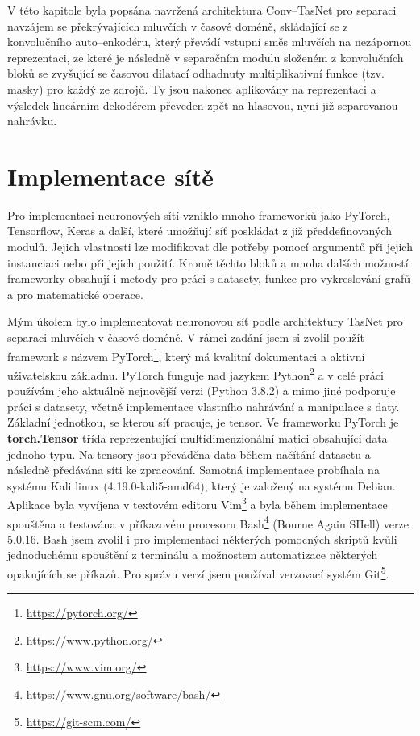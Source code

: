 V této kapitole byla popsána navržená architektura Conv--TasNet pro separaci navzájem se překrývajících mluvčích v časové doméně, skládající se z konvolučního auto--enkodéru, který převádí vstupní směs mluvčích na nezápornou reprezentaci, ze které je následně v separačním modulu složeném z konvolučních bloků se zvyšující se časovou dilatací odhadnuty multiplikativní funkce (tzv. masky) pro každý ze zdrojů. Ty jsou nakonec aplikovány na reprezentaci a výsledek lineárním dekodérem převeden zpět na hlasovou, nyní již separovanou nahrávku.



\chapter{Implementace sítě}
\label{implementace}
Pro implementaci neuronových sítí vzniklo mnoho frameworků jako PyTorch, Tensorflow, Keras a další, které umožňují síť poskládat z již předdefinovaných modulů. Jejich vlastnosti lze modifikovat dle potřeby pomocí argumentů při jejich instanciaci nebo při jejich použití. Kromě těchto bloků a mnoha dalších možností frameworky obsahují i metody pro práci s datasety, funkce pro vykreslování grafů a pro matematické operace.

Mým úkolem bylo implementovat neuronovou síť podle architektury TasNet pro separaci mluvčích v časové doméně. V rámci zadání jsem si zvolil použít framework s názvem PyTorch\footnote{\url{https://pytorch.org/}}, který má kvalitní dokumentaci a aktivní uživatelskou základnu. PyTorch funguje nad jazykem Python\footnote{\url{https://www.python.org/}} a v celé práci používám jeho aktuálně nejnovější verzi (Python 3.8.2) a mimo jiné podporuje práci s datasety, včetně implementace vlastního nahrávání a manipulace s daty. Základní jednotkou, se kterou síť pracuje, je tensor. Ve frameworku PyTorch je \textbf{torch.Tensor} třída reprezentující multidimenzionální matici obsahující data jednoho typu. Na tensory jsou převáděna data během načítání datasetu a následně předávána síti ke zpracování. Samotná implementace probíhala na systému Kali linux (4.19.0-kali5-amd64), který je založený na systému Debian. Aplikace byla vyvíjena v textovém editoru Vim\footnote{\url{https://www.vim.org/}} a byla během implementace spouštěna a testována v příkazovém procesoru Bash\footnote{\url{https://www.gnu.org/software/bash/}} (Bourne Again SHell) verze 5.0.16. Bash jsem zvolil i pro implementaci některých pomocných skriptů kvůli jednoduchému spouštění z terminálu a možnostem automatizace některých opakujících se příkazů. Pro správu verzí jsem používal verzovací systém Git\footnote{\url{https://git-scm.com/}}.

